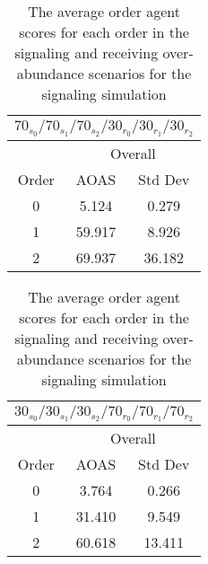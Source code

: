 \begin{table}[h]
    \centering
    \begin{tabular}{|c|c|c|}
    \hline
    \multicolumn{3}{|c|}{$70_{s_{0}}/70_{s_{1}}/70_{s_{2}}/30_{r_{0}}/30_{r_{1}}/30_{r_{2}}$} \\
    \hline
    \multicolumn{1}{|c|}{} & \multicolumn{2}{|c|}{Overall} \\
    \hline
    Order & AOAS & Std Dev \\
    \hline
    0     & 5.124   & 0.279    \\ 
    1     & 59.917  & 8.926   \\
    2     & 69.937  & 36.182   \\ 
    \hline
    \end{tabular}
    \qquad
    \begin{tabular}{|c|c|c|}
    \hline
    \multicolumn{3}{|c|}{$30_{s_{0}}/30_{s_{1}}/30_{s_{2}}/70_{r_{0}}/70_{r_{1}}/70_{r_{2}}$} \\
    \hline
    \multicolumn{1}{|c|}{} & \multicolumn{2}{|c|}{Overall} \\
    \hline
    Order & AOAS & Std Dev \\
    \hline
    0     & 3.764   & 0.266    \\
    1     & 31.410  & 9.549   \\ 
    2     & 60.618  & 13.411   \\ 
    \hline
    \end{tabular}
    \caption{The average order agent scores for each order in the signaling and receiving over-abundance scenarios for the signaling simulation}
    \label{table:sig-overall}
\end{table}